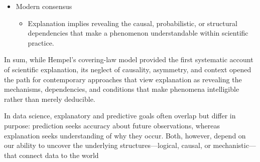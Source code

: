 \documentclass[
  12pt,
]{book}
\providecommand{\tightlist}{%
  \setlength{\itemsep}{0pt}\setlength{\parskip}{0pt}}
\begin{document}
\begin{itemize}
  \begin{itemize}
  \tightlist
  \item
    There is no single canonical model today.
  \item
    Different sciences adopt different explanatory ideals:

    \begin{itemize}
    \tightlist
    \item
      Physics: laws and mathematical deduction.
    \item
      Biology/Medicine: mechanisms and probabilities.
    \end{itemize}
  \end{itemize}
\item
  Modern consensus

  \begin{itemize}
  \tightlist
  \item
    Explanation implies revealing the causal, probabilistic, or structural dependencies that make a phenomenon understandable within scientific practice.
  \end{itemize}
\end{itemize}

In sum, while Hempel's covering-law model provided the first systematic account of scientific explanation, its neglect of causality, asymmetry, and context opened the path for contemporary approaches that view explanation as revealing the mechanisms, dependencies, and conditions that make phenomena intelligible rather than merely deducible.

In data science, explanatory and predictive goals often overlap but differ in purpose: prediction seeks accuracy about future observations, whereas explanation seeks understanding of why they occur. Both, however, depend on our ability to uncover the underlying structures---logical, causal, or mechanistic---that connect data to the world
\end{document}
